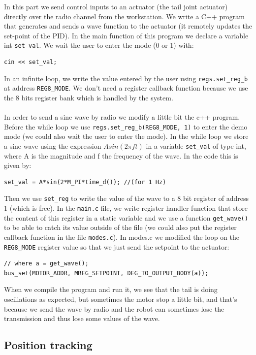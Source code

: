 \documentclass[11pt]{article}
\begin{document}
In this part we send control inputs to an actuator (the tail joint actuator) directly over the radio channel from the workstation. We write a C++ program that generates and sends a wave function to the actuator (it remotely updates the set-point of the PID). In the main function of this program we declare a variable int \texttt{set\_val}. We wait the user to enter the mode (0 or 1) with:
\begin{verbatim}
cin << set_val;
\end{verbatim}
In an infinite loop, we write the value entered by the user using \texttt{regs.set\_reg\_b} at address \texttt{REG8\_MODE}. We don't need a register callback function because we use the 8 bits register bank which is handled by the system.
\\
\\
In order to send a sine wave by radio we modify a little bit the c++ program. Before the while loop we use \texttt{regs.set\_reg\_b(REG8\_MODE, 1)} to enter the demo mode (we could also wait the user to enter the mode). In the while loop we store a sine wave using the expression ${Asin(2{\pi}ft)}$ in a variable \texttt{set\_val} of type int, where A is the magnitude and f the frequency of the wave. In the code this is given by:
\begin{verbatim}
set_val = A*sin(2*M_PI*time_d()); //(for 1 Hz)
\end{verbatim}
Then we use \texttt{set\_reg} to write the value of the wave to a 8 bit register of address 1 (which is free). In the \texttt{main.c} file, we write register handler function that store the content of this register in a static variable and we use a function \texttt{get\_wave()} to be able to catch its value outside of the file (we could also put the register callback function in the file \texttt{modes.c}). In modes.c we modified the loop on the \texttt{REG8\_MODE} register value so that we just send the setpoint to the actuator:
\begin{verbatim}
// where a = get_wave();
bus_set(MOTOR_ADDR, MREG_SETPOINT, DEG_TO_OUTPUT_BODY(a));
\end{verbatim}
When we compile the program and run it, we see that the tail is doing oscillations as expected, but sometimes the motor stop a little bit, and that's because we send the wave by radio and the robot can sometimes lose the transmission and thus lose some values of the wave.


\subsection{Position tracking}
\label{subsection:position_track}
\end{document}
